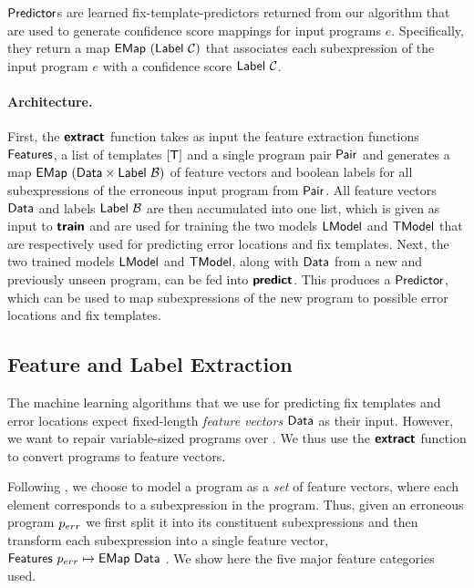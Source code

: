 $\mathsf{Predictor}$s are learned fix-template-predictors returned from our algorithm
that are used to generate confidence score mappings for input programs $e$.
Specifically, they return a map $\mathsf{EMap}\ (\mathsf{Label}\ \mathcal{C})$ that associates each
subexpression of the input program $e$ with a confidence score
$\mathsf{Label}\ \mathcal{C}$. 

\paragraph{Architecture.}
First, the $\bm{\mathsf{extract}}$ function takes as input the feature extraction
functions $\mathsf{Features}$, a list of templates $[\mathsf{T}]$ and a single program
pair $\mathsf{Pair}$ and generates a map $\mathsf{EMap}\ (\mathsf{Data} \times
\mathsf{Label}\ \mathcal{B})$ of feature vectors and boolean labels for all
subexpressions of the erroneous input program from $\mathsf{Pair}$.
%
All feature vectors $\mathsf{Data}$ and labels $\mathsf{Label}\ \mathcal{B}$ are then
accumulated into one list, which is given as input to $\bm{\mathsf{train}}$ and are used
for training the two models $\mathsf{LModel}$ and $\mathsf{TModel}$ that are respectively used
for predicting error locations and fix templates.
%
Next, the two trained models $\mathsf{LModel}$ and $\mathsf{TModel}$, along with $\mathsf{Data}$ from
a new and previously unseen program, can be fed into $\bm{\mathsf{predict}}$. This
produces a $\mathsf{Predictor}$, which can be used to map subexpressions of the new
program to possible error locations and fix templates.




\subsection{Feature and Label Extraction}
\label{sec:templ-pred:extract}
The machine learning algorithms that we use for predicting fix templates and
error locations expect fixed-length \emph{feature vectors} $\mathsf{Data}$ as their
input. However, we want to repair variable-sized programs over \lang. We thus
use the $\bm{\mathsf{extract}}$ function to convert programs to feature vectors.

Following \citep{Seidel:2017}, we choose to model a program as a \emph{set} of
feature vectors, where each element corresponds to a subexpression in the
program. Thus, given an erroneous program $p_{err}$ we first split it into its
constituent subexpressions and then transform each subexpression into a single
feature vector, \ie $\mathsf{Features}\ p_{err} \mapsto \mathsf{EMap}\ \mathsf{Data}$ . We show here
the five major feature categories used.

